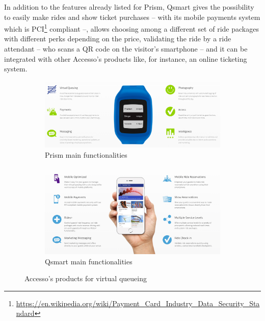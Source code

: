 In addition to the features already listed for Prism, Qsmart gives the possibility to easily make rides and
show ticket purchases -- with its mobile payments system which is
PCI\footnote{\url{https://en.wikipedia.org/wiki/Payment_Card_Industry_Data_Security_Standard}} compliant --,
allows choosing among a different set of ride packages with different perks depending on the price, validating the
ride by a ride attendant -- who scans a QR code on the visitor's smartphone -- and it can be integrated with other Accesso's products like, for instance, an online ticketing system.


\begin{figure}[H]
	\centering
	\begin{subfigure}[b]{0.85\textwidth}
		\centering
		\includegraphics[width=\textwidth]{img/prism}
		\caption{Prism main functionalities}
		\label{fig:prism}
	\end{subfigure}
	\hfill
	\begin{subfigure}[b]{0.85\textwidth}
		\centering
		\includegraphics[width=\textwidth]{img/qsmart}
		\caption{Qsmart main functionalities}
		\label{fig:qsmart}
	\end{subfigure}
	\caption{Accesso's products for virtual queueing\protect\footnotemark}
	\label{fig:prismart}
\end{figure}

